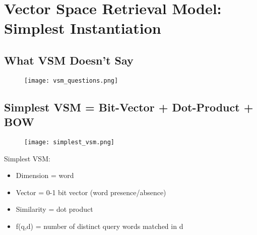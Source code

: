\section{Vector Space Retrieval Model: Simplest Instantiation}

\subsection{What VSM Doesn’t Say}
\begin{figure}[H]
    \centering
    \texttt{[image: vsm\_questions.png]}
\end{figure}



\subsection{Simplest VSM = Bit-Vector + Dot-Product + BOW}
\begin{figure}[H]
    \centering
    \texttt{[image: simplest\_vsm.png]}
\end{figure}

Simplest VSM:
\begin{itemize}
\item Dimension = word
\item Vector = 0-1 bit vector (word presence/absence)
\item Similarity = dot product
\item f(q,d) = number of distinct query words matched in d
\end{itemize}
